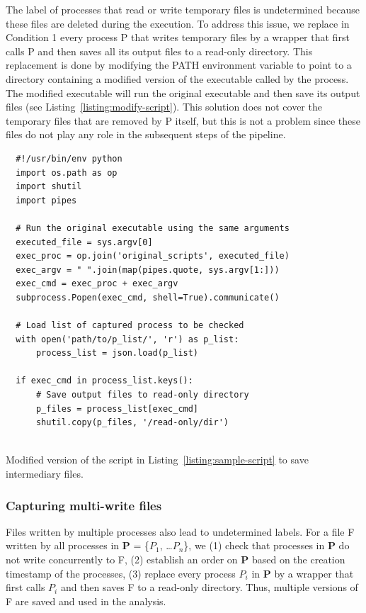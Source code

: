 \documentclass[a4paper,num-refs]{oup-contemporary}
\begin{document}
The label of processes that read or 
write temporary files is undetermined because these files are deleted during 
the execution. To address this issue, we replace in Condition 1 every process P that 
writes temporary files by a wrapper that first calls P and then
saves all its output files to a read-only directory. This replacement is
done by modifying the PATH environment variable to point to a directory
containing a modified version of the executable called by the process. The
modified executable will run the original executable and then save its
output files (see Listing~\ref{listing:modify-script}). 
This 
solution does not cover the temporary files that are removed by P 
itself, but this is not a problem since these files do not play any role in 
the subsequent steps of the pipeline. 

\begin{listing}
  \begin{verbatim}
  #!/usr/bin/env python
  import os.path as op
  import shutil
  import pipes

  # Run the original executable using the same arguments
  executed_file = sys.argv[0]
  exec_proc = op.join('original_scripts', executed_file)
  exec_argv = " ".join(map(pipes.quote, sys.argv[1:]))
  exec_cmd = exec_proc + exec_argv
  subprocess.Popen(exec_cmd, shell=True).communicate()
  
  # Load list of captured process to be checked
  with open('path/to/p_list/', 'r') as p_list:
      process_list = json.load(p_list)

  if exec_cmd in process_list.keys():
      # Save output files to read-only directory
      p_files = process_list[exec_cmd]
      shutil.copy(p_files, '/read-only/dir')
  
  \end{verbatim}
    \caption{Modified version of the script in Listing~\ref{listing:sample-script} to save intermediary files.}
    \label{listing:modify-script}
  \end{listing}

\subsubsection{Capturing multi-write files}

Files written by multiple processes also lead 
to undetermined labels. For a file F 
written by all processes in \textbf{P} = \{$P_{1}$, \ldots $P_{n}$\}, we 
(1) check that processes in \textbf{P} do not write concurrently to F, 
(2) establish an order on \textbf{P} based on the creation timestamp 
of the processes, (3) replace every process $P_{i}$ in \textbf{P} by 
a wrapper that first calls $P_{i}$ and then saves F to a read-only 
directory. Thus, multiple versions of F are saved and used in the 
analysis. 
\end{document}
